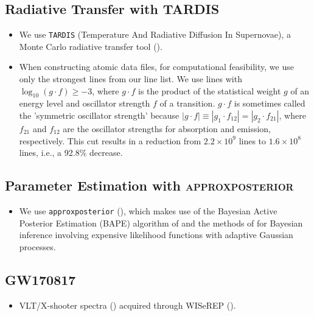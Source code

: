 \documentclass[twocolumn]{aastex63}
\begin{document}
\subsection{Radiative Transfer with \textsc{TARDIS}}\label{ssc:TARDIS}
\begin{itemize}

    \item We use \texttt{TARDIS} (Temperature And Radiative Diffusion In Supernovae), a Monte Carlo radiative transfer tool (\citealt{kerzendorf14}).
    
    \item When constructing atomic data files, for computational feasibility, we use only the strongest lines from our line list. We use lines with $\log_{10}(g \cdot f) \geqslant -3$, where $g \cdot f$ is the product of the statistical weight $g$ of an energy level and oscillator strength $f$ of a transition. $g \cdot f$ is sometimes called the 'symmetric oscillator strength' because $|g\cdot f| \equiv |g_1 \cdot f_{12}| = |g_2 \cdot f_{21}|$, where $f_{21}$ and $f_{12}$ are the oscillator strengths for absorption and emission, respectively. This cut results in a reduction from $2.2 \times 10^9$ lines to $1.6 \times 10^8$ lines, i.e., a 92.8\% decrease.
\end{itemize}

\subsection{Parameter Estimation with \textsc{approxposterior}}\label{ssc:approxposterior}
\begin{itemize}
    \item We use \texttt{approxposterior} (\citealt{fleming18}), which makes use of the Bayesian Active Posterior Estimation (BAPE) algorithm of \cite{kandasamy17} and the methods of \cite{wang18} for Bayesian inference involving expensive likelihood functions with adaptive Gaussian processes.
\end{itemize}

\subsection{GW170817}\label{ssc:GW170817}
\begin{itemize}
    \item VLT/X-shooter spectra (\citealt{pian17, smartt17}) acquired through WISeREP (\citealt{yaron12}).
\end{itemize}

\end{document}
